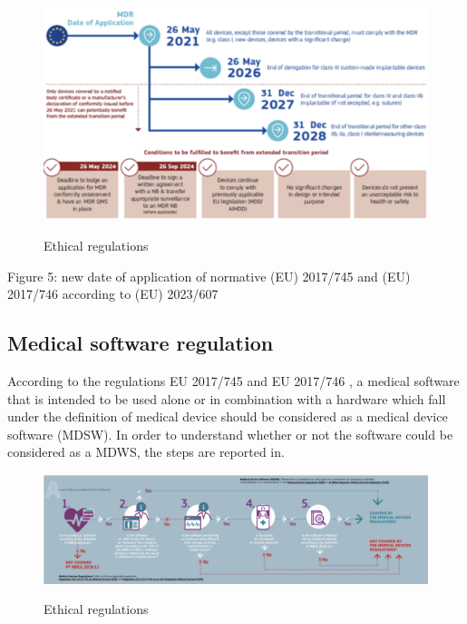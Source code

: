 \documentclass{Configuration_Files/PoliMi3i_thesis}
\begin{document}
\begin{figure}[H]
	\includegraphics[scale=0.3]{Ethics/Screenshot 2024-08-15 at 10.54.56.png}
	\centering
    \label{ethics_1}
    \caption{Ethical regulations}
\end{figure}


Figure 5: new date of application of normative (EU) 2017/745 and (EU) 2017/746 according to (EU) 2023/607 \cite{NewRevisedResource}

\subsection{Medical software regulation}

According to the regulations EU 2017/745 \cite{RegolamentoUE20172017} and EU 2017/746 \cite{RegolamentoUE20172017a}, a medical software that is intended to be used alone or in combination with a hardware which fall under the definition of medical device should be considered as a medical device software (MDSW). 
In order to understand whether or not the software could be considered as a MDWS, the steps are reported in.

\begin{figure}[H]

	\includegraphics[scale=0.3]{Ethics/Screenshot 2024-08-15 at 10.55.04.png}
	\centering
    \label{ethics_2}
    \caption{Ethical regulations}
\end{figure}
\end{document}
